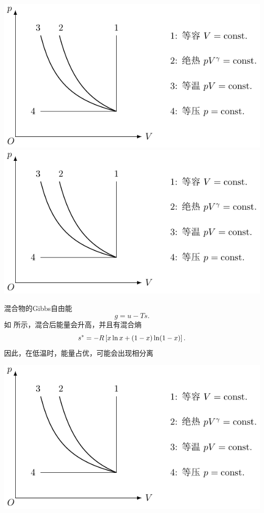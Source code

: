 \begin{center}
	\includegraphics[page=19]{figures/tikz/coordinates.pdf}
	\includegraphics[page=20]{figures/tikz/coordinates.pdf}
	\label{fig:mixture-energy-entropy}
\end{center}
混合物的Gibbs自由能
\[g=u-Ts.\]
如 所示，混合后能量会升高，并且有混合熵
\[s^*=-R\left[x\ln x+(1-x)\ln(1-x)\right].\]
因此，在低温时，能量占优，可能会出现相分离
\begin{center}
	\includegraphics[page=21]{figures/tikz/coordinates.pdf}
\end{center}
